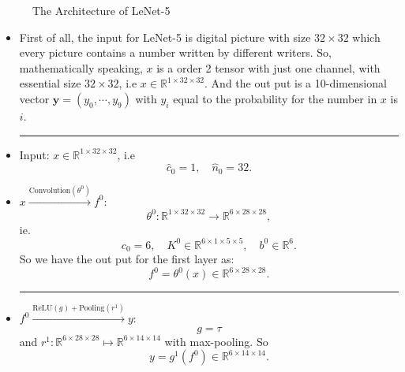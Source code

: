 \begin{figure}[!htb]
	\caption{The Architecture of LeNet-5}      
	\label{LeNet-5}
\end{figure}

\begin{itemize}
	\item First of all, the input for LeNet-5 is digital picture with size $32 \times 32$ which every picture contains a number written by different writers. So, mathematically speaking, $x$ is a order 2 tensor with just one channel, with essential size $32 \times 32$, i.e $x \in \mathbb{R}^{ 1 \times 32 \times 32 }$.  And the out put is a 10-dimensional vector $\bm y = (y_0, \cdots, y_9)$ with $y_i$ equal to the probability for the number in $x$ is $i$. 
	
	\bigskip \hrule \bigskip
	\item Input: $x \in  \mathbb{R}^{ 1 \times 32 \times 32}$,  i.e 
	\begin{equation}
	\hat c_0 = 1, \quad \hat n_0 = 32.
	\end{equation}
	
	\item  $x \xrightarrow{\text{Convolution} ( \theta^0)} f^0$: 
	\begin{equation}
	\theta^0: \mathbb R^{1 \times 32 \times 32} \to \mathbb R^{6 \times 28 \times 28},
	\end{equation}
	ie.
	\begin{equation}
	c_0 = 6, \quad K^0 \in \mathbb R^{6 \times 1 \times 5 \times 5}, \quad b^0 \in \mathbb{R}^6.
	\end{equation}
	So we have the out put for the first layer as:
	\begin{equation}
	f^0 = \theta^0(x) \in \mathbb{R}^{6 \times 28 \times 28}.
	\end{equation}
	
	\bigskip \hrule \bigskip
	\item $f^0 \xrightarrow{\text{ReLU}(g) + \text{Pooling}(r^1)} y$: \\
	\begin{equation}
	g = \tau 
	\end{equation}
	and $r^1: \mathbb R^{6 \times 28 \times 28} \mapsto \mathbb R^{6 \times 14 \times 14} $ with max-pooling.
	So
	\begin{equation}
	y = g^1(f^0) \in \mathbb R^{6 \times 14 \times 14}.
	\end{equation}
	

\end{itemize}
